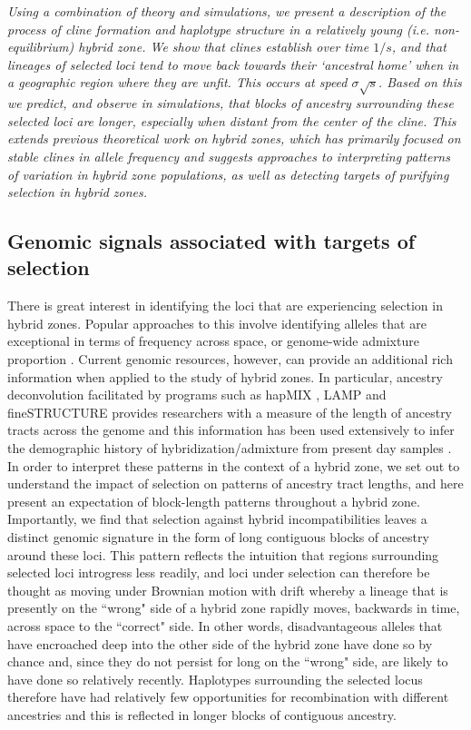 \documentclass[11pt,letterpaper]{article}
\newcommand{\alisa}[1]{{\em \color{red} #1}}
\begin{document}
\alisa{Using a combination of theory and simulations, we present a description of the process of cline formation and haplotype structure in a relatively young (i.e. non-equilibrium) hybrid zone.
We show that clines establish over time $1/s$, and that lineages of selected loci tend to move back towards their `ancestral home' when in a geographic region where they  are unfit. 
This occurs at speed $\sigma\sqrt{s}$. Based on this we predict, and observe in simulations, that blocks of ancestry surrounding these selected loci are longer, especially when distant from the center of the cline. 
This extends previous theoretical work on hybrid zones, which has primarily focused on stable clines in allele frequency and  suggests approaches to interpreting patterns of variation in hybrid zone populations, as well as detecting targets of purifying selection in hybrid zones.}

\subsection*{Genomic signals associated with targets of selection}

There is great interest in identifying the loci that are experiencing selection in hybrid zones. Popular approaches to this involve identifying alleles that are exceptional in terms of frequency across space, or genome-wide admixture proportion \citep{Porter1997,Gompert2012}.  
Current genomic resources, however, can provide an additional rich information when applied to the study of hybrid zones.
In particular, ancestry deconvolution facilitated by programs such as  hapMIX \citep{Price2009}, LAMP \citep{Sankararaman2008} and fineSTRUCTURE \citep{Lawson2012} provides researchers with a measure of the length of ancestry tracts across the genome and this information has been used extensively to infer the demographic history of hybridization/admixture from present day samples \citep[e.g. ][]{Hellenthal2014}. 
In order to interpret these patterns in the context of a hybrid zone, we set out to understand the impact of selection on patterns of ancestry tract lengths, and here present an expectation of block-length patterns throughout a hybrid zone. 
Importantly, we find that selection against hybrid incompatibilities leaves a distinct genomic signature in the form of long contiguous blocks of ancestry around these loci.
This pattern reflects the intuition that regions surrounding selected loci introgress less readily, and loci under selection can therefore be thought as moving under Brownian motion with drift whereby a lineage that is presently on the ``wrong" side of a hybrid zone rapidly moves, backwards in time, across space to the ``correct" side. 
In other words, disadvantageous alleles that have encroached deep into the other side of the hybrid zone have done so by chance and, since they do not persist for long on the ``wrong" side, are likely to have done so relatively recently. Haplotypes surrounding the selected locus therefore have had relatively few opportunities for recombination with different ancestries and this is reflected in longer blocks of contiguous ancestry.
\end{document}
